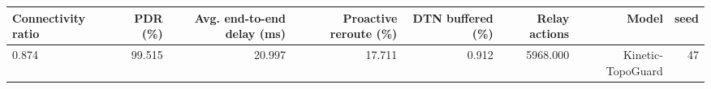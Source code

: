 \begin{tabular}{lrrrrrrr}
\toprule
Connectivity ratio & PDR (\%) & Avg. end-to-end delay (ms) & Proactive reroute (\%) & DTN buffered (\%) & Relay actions & Model & seed \\
\midrule
0.874 & 99.515 & 20.997 & 17.711 & 0.912 & 5968.000 & Kinetic-TopoGuard & 47 \\
\bottomrule
\end{tabular}